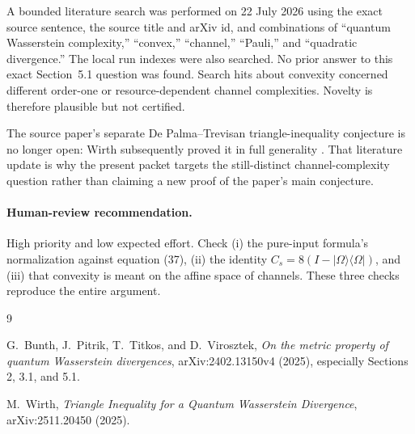 \documentclass[11pt]{article}
\theoremstyle{remark}
\begin{document}
A bounded literature search was performed on 22 July 2026 using the exact
source sentence, the source title and arXiv id, and combinations of
``quantum Wasserstein complexity,'' ``convex,'' ``channel,'' ``Pauli,'' and
``quadratic divergence.''  The local run indexes were also searched.  No
prior answer to this exact Section~5.1 question was found.  Search hits about
convexity concerned different order-one or resource-dependent channel
complexities.  Novelty is therefore plausible but not certified.

The source paper's separate De Palma--Trevisan triangle-inequality conjecture
is no longer open: Wirth subsequently proved it in full generality
\cite{Wirth}.  That literature update is why the present packet targets the
still-distinct channel-complexity question rather than claiming a new proof of
the paper's main conjecture.

\paragraph{Human-review recommendation.}
High priority and low expected effort.  Check (i) the pure-input formula's
normalization against equation (37), (ii) the identity
$C_s=8(I-|\Omega\rangle\langle\Omega|)$, and (iii) that convexity is meant on
the affine space of channels.  These three checks reproduce the entire
argument.

\begin{thebibliography}{9}
\setlength{\itemsep}{0.6em}

G.~Bunth, J.~Pitrik, T.~Titkos, and D.~Virosztek,
\emph{On the metric property of quantum Wasserstein divergences},
arXiv:2402.13150v4 (2025), especially Sections 2, 3.1, and 5.1.

M.~Wirth,
\emph{Triangle Inequality for a Quantum Wasserstein Divergence},
arXiv:2511.20450 (2025).

\end{thebibliography}
\end{document}
